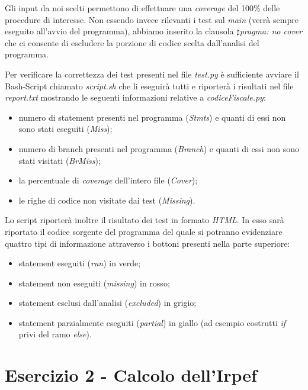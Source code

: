 \documentclass[a4paper, 12pt]{article}
\begin{document}
	Gli input da noi scelti permettono di effettuare una \textit{coverage} del 100\% delle procedure di interesse. Non essendo invece rilevanti i test sul \textit{main} (verrà sempre eseguito all'avvio del programma), abbiamo inserito la clausola \textit{$\sharp$pragma: no cover} che ci consente di escludere la porzione di codice scelta dall'analisi del programma.
	
	Per verificare la correttezza dei test presenti nel file \textit{test.py} è sufficiente avviare il Bash-Script chiamato \textit{script.sh} che li eseguirà tutti e riporterà i risultati nel file \textit{report.txt} mostrando le seguenti informazioni relative a \textit{codiceFiscale.py}:
	\begin{itemize}
		\item numero di statement presenti nel programma (\textit{Stmts}) e quanti di essi non sono stati eseguiti (\textit{Miss});
		\item numero di branch presenti nel programma (\textit{Branch}) e quanti di essi non sono stati visitati (\textit{BrMiss});
		\item la percentuale di \textit{coverage} dell'intero file (\textit{Cover});
		\item le righe di codice non visitate dai test (\textit{Missing}).
		
	\end{itemize}
	
	\noindent
	Lo script riporterà inoltre il risultato dei test in formato \textit{HTML}. In esso sarà riportato il codice sorgente del programma del quale si potranno evidenziare quattro tipi di informazione attraverso i bottoni presenti nella parte superiore:
	\begin{itemize}
		\item statement eseguiti (\textit{run}) in verde;
		\item statement non eseguiti (\textit{missing}) in rosso;
		\item statement esclusi dall'analisi (\textit{excluded}) in grigio;
		\item statement parzialmente eseguiti (\textit{partial}) in giallo (ad esempio costrutti \textit{if} privi del ramo \textit{else}).
	\end{itemize}
	
	\newpage
	\section*{Esercizio 2 - Calcolo dell'Irpef}
	
\end{document}
